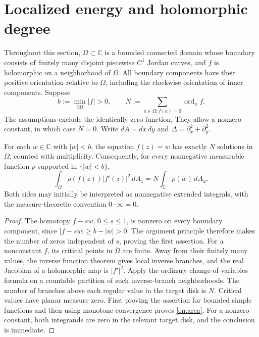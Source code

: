 \section{Localized energy and holomorphic degree}
\label{en:section}

Throughout this section, $\Omega\subset\mathbb C$ is a bounded connected
domain whose boundary consists of finitely many disjoint piecewise $C^1$ Jordan curves, and $f$ is
holomorphic on a neighborhood of $\overline\Omega$. All boundary components
have their positive orientation relative to $\Omega$, including the
clockwise orientation of inner components. Suppose
\begin{equation}\label{en:boundary}
 b:=\min_{\partial\Omega}|f|>0,\qquad
 N:=\sum_{a\in\Omega:f(a)=0}\operatorname{ord}_a f.
\end{equation}
The assumptions exclude the identically zero function. They allow a
nonzero constant, in which case $N=0$. Write $dA=dx\,dy$ and
$\Delta=\partial_x^2+\partial_y^2$.

\begin{lemma}\label{en:valence}
For each $w\in\mathbb C$ with $|w|<b$, the equation $f(z)=w$ has exactly
$N$ solutions in $\Omega$, counted with multiplicity. Consequently, for
every nonnegative measurable function $\rho$ supported in $\{|w|<b\}$,
\begin{equation}\label{en:area}
 \int_\Omega \rho(f(z))|f'(z)|^2\,dA_z
 =N\int_{\mathbb C}\rho(w)\,dA_w.
\end{equation}
Both sides may initially be interpreted as nonnegative extended integrals, with the measure-theoretic convention $0\cdot\infty=0$.
\end{lemma}
\begin{proof}
The homotopy $f-sw$, $0\le s\le1$, is nonzero on every boundary component,
since $|f-sw|\ge b-|w|>0$. The argument principle therefore makes the
number of zeros independent of $s$, proving the first assertion. For a
nonconstant $f$, its critical points in $\overline\Omega$ are finite.
Away from their finitely many values, the inverse function theorem gives
local inverse branches, and the real Jacobian of a holomorphic map is
$|f'|^2$. Apply the ordinary change-of-variables formula on a countable
partition of such inverse-branch neighborhoods. The number of branches
above each regular value in the target disk is $N$. Critical values have
planar measure zero. First proving the assertion for bounded simple
functions and then using monotone convergence proves \eqref{en:area}.
For a nonzero constant, both integrands are zero in the relevant target
disk, and the conclusion is immediate.
\end{proof}

